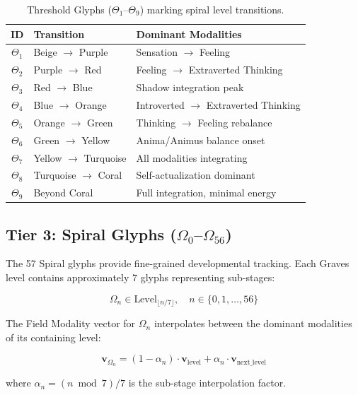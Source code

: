 \documentclass[11pt,a4paper]{article}
\begin{document}
\begin{table}[h]
\centering
\caption{Threshold Glyphs ($\Theta_1$--$\Theta_9$) marking spiral level transitions.}
\label{tab:threshold}
\begin{tabular}{@{}cll@{}}
\toprule
ID & Transition & Dominant Modalities \\
\midrule
$\Theta_1$ & Beige $\to$ Purple & Sensation $\to$ Feeling \\
$\Theta_2$ & Purple $\to$ Red & Feeling $\to$ Extraverted Thinking \\
$\Theta_3$ & Red $\to$ Blue & Shadow integration peak \\
$\Theta_4$ & Blue $\to$ Orange & Introverted $\to$ Extraverted Thinking \\
$\Theta_5$ & Orange $\to$ Green & Thinking $\to$ Feeling rebalance \\
$\Theta_6$ & Green $\to$ Yellow & Anima/Animus balance onset \\
$\Theta_7$ & Yellow $\to$ Turquoise & All modalities integrating \\
$\Theta_8$ & Turquoise $\to$ Coral & Self-actualization dominant \\
$\Theta_9$ & Beyond Coral & Full integration, minimal energy \\
\bottomrule
\end{tabular}
\end{table}

\subsection{Tier 3: Spiral Glyphs ($\Omega_0$--$\Omega_{56}$)}

The 57 Spiral glyphs provide fine-grained developmental tracking. Each Graves level contains approximately 7 glyphs representing sub-stages:

\begin{equation}
\Omega_n \in \text{Level}_{\lfloor n/7 \rfloor}, \quad n \in \{0, 1, \ldots, 56\}
\end{equation}

The Field Modality vector for $\Omega_n$ interpolates between the dominant modalities of its containing level:

\begin{equation}
\mathbf{v}_{\Omega_n} = (1 - \alpha_n) \cdot \mathbf{v}_{\text{level}} + \alpha_n \cdot \mathbf{v}_{\text{next\_level}}
\end{equation}

where $\alpha_n = (n \bmod 7) / 7$ is the sub-stage interpolation factor.
\end{document}
